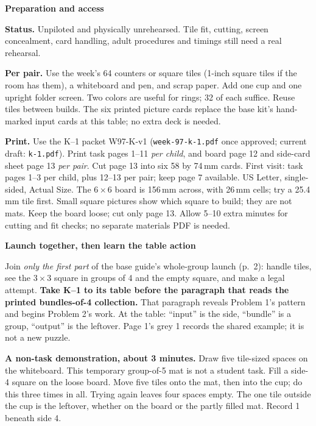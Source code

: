 \documentclass[11pt]{article}
\newcommand{\head}[1]{\par\textbf{\large #1}\par}
\begin{document}
\head{Preparation and access}
\textbf{Status.} Unpiloted and physically unrehearsed. Tile fit, cutting, screen concealment, card handling, adult procedures and timings still need a real rehearsal.

\textbf{Per pair.} Use the week's 64 counters or square tiles (1-inch square tiles if the room has them), a whiteboard and pen, and scrap paper. Add one cup and one upright folder screen. Two colors are useful for rings; 32 of each suffice. Reuse tiles between builds. The six printed picture cards replace the base kit's hand-marked input cards at this table; no extra deck is needed.

\textbf{Print.} Use the K--1 packet W97-K-v1 (\texttt{week-97-k-1.pdf} once approved; current draft: \texttt{k-1.pdf}). Print task pages 1--11 \emph{per child}, and board page 12 and side-card sheet page 13 \emph{per pair}. Cut page 13 into six 58 by 74\,mm cards. First visit: task pages 1--3 per child, plus 12--13 per pair; keep page 7 available. US Letter, single-sided, Actual Size. The $6\times6$ board is 156\,mm across, with 26\,mm cells; try a 25.4\,mm tile first. Small square pictures show which square to build; they are not mats. Keep the board loose; cut only page 13. Allow 5--10 extra minutes for cutting and fit checks; no separate materials PDF is needed.

\newpage
\head{Launch together, then learn the table action}
Join \emph{only the first part} of the base guide's whole-group launch (p.\ 2): handle tiles, see the $3\times3$ square in groups of 4 and the empty square, and make a legal attempt. \textbf{Take K--1 to its table before the paragraph that reads the printed bundles-of-4 collection.} That paragraph reveals Problem 1's pattern and begins Problem 2's work. At the table: ``input'' is the side, ``bundle'' is a group, ``output'' is the leftover. Page 1's grey 1 records the shared example; it is not a new puzzle.

\textbf{A non-task demonstration, about 3 minutes.} Draw five tile-sized spaces on the whiteboard. This temporary group-of-5 mat is not a student task. Fill a side-4 square on the loose board. Move five tiles onto the mat, then into the cup; do this three times in all. Trying again leaves four spaces empty. The one tile outside the cup is the leftover, whether on the board or the partly filled mat. Record 1 beneath side 4.
\end{document}
